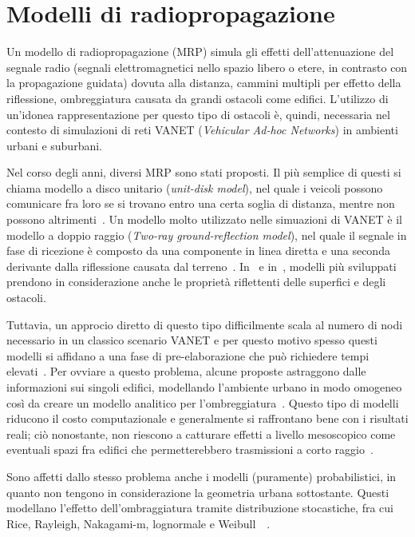 \section{Modelli di radiopropagazione}\label{sec:modelli-propagazione}
Un modello di radiopropagazione (MRP) simula gli effetti dell'attenuazione del segnale radio (segnali elettromagnetici nello spazio libero o etere, in contrasto con la propagazione guidata)
dovuta alla distanza, cammini multipli per effetto della riflessione, ombreggiatura causata da grandi ostacoli come edifici.
L'utilizzo di un'idonea rappresentazione per questo tipo di ostacoli è, quindi, necessaria nel contesto di simulazioni di reti VANET (\textit{Vehicular Ad-hoc Networks}) in ambienti urbani
e suburbani.

Nel corso degli anni, diversi MRP sono stati proposti.
Il più semplice di questi si chiama modello a disco unitario (\textit{unit-disk model}), nel quale i veicoli possono comunicare fra loro se si trovano entro una certa soglia
di distanza, mentre non possono altrimenti~\cite{6554832}.
Un modello molto utilizzato nelle simuazioni di VANET è il modello a doppio raggio (\textit{Two-ray ground-reflection model}),
nel quale il segnale in fase di ricezione è composto da una componente in linea diretta e una seconda derivante dalla riflessione causata dal terreno~\cite{DBLP:books/daglib/0091821}.
In~\cite{Schmitz:2006:ERW:1164717.1164730} e in~\cite{Souley2005RealisticUS}, modelli più sviluppati prendono in considerazione anche le proprietà riflettenti delle superfici e degli ostacoli.

Tuttavia, un approcio diretto di questo tipo difficilmente scala al numero di nodi necessario in un classico scenario VANET e per questo motivo
spesso questi modelli si affidano a una fase di pre-elaborazione che può richiedere tempi elevati~\cite{Stepanov:2008:IMR:1293378.1293656}.
Per ovviare a questo problema, alcune proposte astraggono dalle informazioni sui singoli edifici, modellando l'ambiente urbano in modo omogeneo
così da creare un modello analitico per l'ombreggiatura~\cite{1492678}.
Questo tipo di modelli riducono il costo computazionale e generalmente si raffrontano bene con i risultati reali;
ciò nonostante, non riescono a catturare effetti a livello mesoscopico come eventuali spazi fra edifici che permetterebbero trasmissioni a corto raggio~\cite{Giordano:2010:CST:1860058.1860065}.

Sono affetti dallo stesso problema anche i modelli (puramente) probabilistici, in quanto non tengono in considerazione la geometria urbana sottostante.
Questi modellano l'effetto dell'ombraggiatura tramite distribuzione stocastiche, fra cui Rice, Rayleigh, Nakagami-m, lognormale e Weibull~\cite{6554832}~\cite{Rappaport:2001:WCP:559977}.
%
